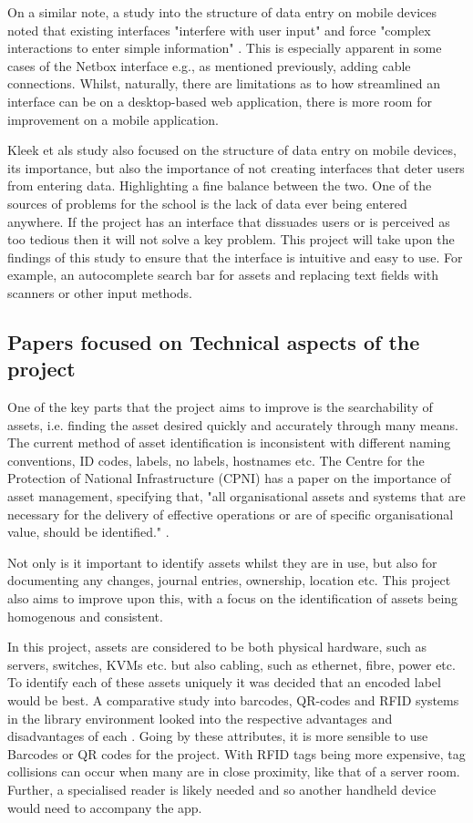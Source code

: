 \documentclass [11pt,a4paper]{article}
\begin{document}
On a similar note, a study into the structure of data entry on mobile devices noted that existing interfaces "interfere with user input" and force "complex interactions to enter simple information" \cite{van2007gui}. This is especially apparent in some cases of the Netbox interface e.g., as mentioned previously, adding cable connections. Whilst, naturally, there are limitations as to how streamlined an interface can be on a desktop-based web application, there is more room for improvement on a mobile application.
\pagebreak

Kleek et als \cite{van2007gui} study also focused on the structure of data entry on mobile devices, its importance, but also the importance of not creating interfaces that deter users from entering data. Highlighting a fine balance between the two. One of the sources of problems for the school is the lack of data ever being entered anywhere. If the project has an interface that dissuades users or is perceived as too tedious then it will not solve a key problem. This project will take upon the findings of this study to ensure that the interface is intuitive and easy to use. For example, an autocomplete search bar for assets and replacing text fields with scanners or other input methods. 

\subsection{Papers focused on Technical aspects of the project}
\label{sec:technical}

One of the key parts that the project aims to improve is the searchability of assets, i.e. finding the asset desired quickly and accurately through many means. The current method of asset identification is inconsistent with different naming conventions, ID codes, labels, no labels, hostnames etc. The Centre for the Protection of National Infrastructure (CPNI) has a paper on the importance of asset management, specifying that, "all organisational assets and systems that are necessary for the delivery of effective operations or are of specific organisational value, should be identified." \cite{cpni}.

Not only is it important to identify assets whilst they are in use, but also for documenting any changes, journal entries, ownership, location etc. This project also aims to improve upon this, with a focus on the identification of assets being homogenous and consistent.

In this project, assets are considered to be both physical hardware, such as servers, switches, KVMs etc. but also cabling, such as ethernet, fibre, power etc. To identify each of these assets uniquely it was decided that an encoded label would be best. A comparative study into barcodes, QR-codes and RFID systems in the library environment looked into the respective advantages and disadvantages of each \cite{lotlikar2013comparative}. Going by these attributes, it is more sensible to use Barcodes or QR codes for the project. With RFID tags being more expensive, tag collisions can occur when many are in close proximity\cite{lotlikar2013comparative}, like that of a server room. Further, a specialised reader is likely needed and so another handheld device would need to accompany the app.
\end{document}
